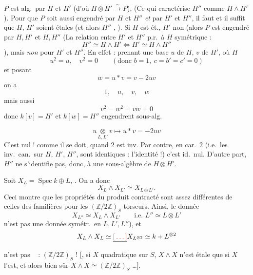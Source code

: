 \documentclass[11pt,a4paper]{article}
\begin{document}

 $P$ est  alg.\ par $H$ et $H'$ (d'où $H \otimes H' \xrightarrow{\sim} P$),  (Ce qui caractérise $H''$ comme \ill{} $H \wedge H'$). Pour que $P$ soit aussi engendré par $H$ et $H''$ \emph{et} par $H'$ et $H''$, il faut et il suffit que $H$, $H'$ soient étales (et alors $H''$ , ). Si $H$ est ét., $H'$ non (alors $P$ est engendré par $H, H'$ et $H, H''$ (La relation entre $H'$ et $H''$ p.r.\ à $H$  symétrique :
\[
  H'' \simeq H \wedge H' \iff H' \simeq H \wedge H''
\]
), mais \emph{non} pour $H'$ et $H''$. En effet : prenant une base $u$ de $H$, $v$ de $H'$, où $H$ 
\[
  u^2 = u, \quad v^2 = 0 \qquad (\text{donc } b = 1,\ c = b' = c' = 0)
\]
et posant
\[
  w = u * v = v - 2uv
\]
on a   
\[
  1, \quad u, \quad v, \quad w
\]
mais aussi
\[
  v^2 = w^2 = vw = 0
\]
donc $k[v] = H'$ et $k[w] = H''$ engendrent sous-alg.

\[
  u \underset{L,L'}{\otimes} v \longmapsto u * v = -2uv
\]
C'est nul !  comme il se doit, quand $2$ est inv. Par contre, en car.\ $2$  (i.e.\ les inv.\ can.\ sur  $H$, $H'$, $H''$, sont identiques : l'identité !) c'est id.\ nul. D'autre part, $H''$ ne s'identifie pas, donc, à une sous-algèbre de $H \otimes H'$.


Soit $X_L = \operatorname{Spec} k \oplus L$, .  On a donc
\[
  X_L \wedge X_{L'} \simeq X_{L \otimes L'} .
\]
Ceci montre que les propriétés du produit contracté sont assez différentes de celles des   familières pour les $(\mathbb{Z}/2\mathbb{Z})_S$-torseurs. Ainsi, le donnée
\[
  X_{L''} \simeq X_L \wedge X_{L'} \qquad \text{i.e.\ } L'' \simeq L \otimes L'
\]
n'est pas une donnée symétr.\ en $L, L', L''$), et
\[
  X_L \wedge X_L \simeq \struck{\ill{}} X_{L^{\otimes 2}} \simeq k + L^{\otimes 2}
\]
n'est pas \  : $(\mathbb{Z}/2\mathbb{Z})_S$ ! [, si $X$ quadratique sur $S$, $X \wedge X$ n'est étale que si $X$ l'est, et alors bien sûr $X \wedge X \simeq (\mathbb{Z}/2\mathbb{Z})_S$ …].
\end{document}
